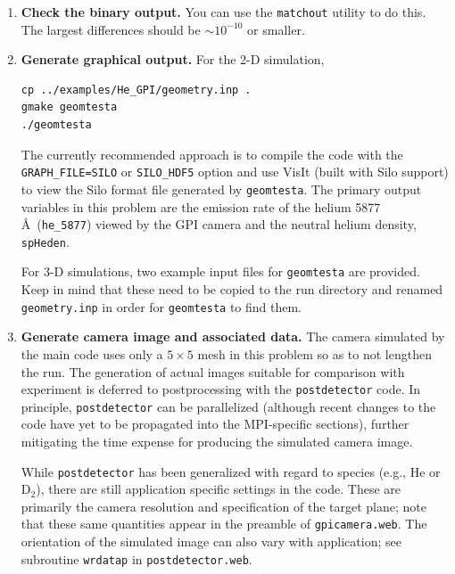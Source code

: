 \documentclass[12pt]{report}
\begin{document}
\begin{enumerate}
digits of precision.  If an exact match is not obtained, something
is amiss. These results were obtained with {\tt Triangle} V.\ 1.6.
  \item {\bf Check the binary output.}
You can use the {\tt matchout} utility to do this.  The largest differences
should be $\sim 10^{-10}$ or smaller.
  \item {\bf Generate graphical output.}
For the 2-D simulation,
\begin{verbatim}
cp ../examples/He_GPI/geometry.inp .
gmake geomtesta
./geomtesta
\end{verbatim}
The currently recommended approach is to compile the code with the
\verb+GRAPH_FILE=SILO+ or \verb+SILO_HDF5+ 
option and use VisIt (built with Silo
support) to view the Silo format file generated by {\tt geomtesta}.
The primary output variables in this problem are the emission rate
of the helium 5877 \AA\  (\verb+he_5877+) viewed by the GPI camera
and the neutral helium density, \verb+spHeden+.

For 3-D simulations, two example input files for {\tt geomtesta} are
provided.  Keep in mind that these need to be copied to the
run directory and renamed {\tt geometry.inp} in order for {\tt geomtesta} to
find them.
\item {\bf Generate camera image and associated data.}
The camera simulated by the main code uses only a $5 \times 5$ mesh in
this problem so as to not lengthen the run.  The
generation of actual images suitable for comparison with
experiment is deferred to postprocessing with the {\tt postdetector}
code.  In principle, {\tt postdetector} can be parallelized (although recent
changes to the code have yet to be propagated into the MPI-specific
sections), further mitigating the time expense for producing
the simulated camera image.

While {\tt postdetector} has been generalized with regard to species
(e.g., He or D$_{2}$), there are still application specific settings
in the code.  These are primarily the camera resolution and
specification of the target plane; note that these same
quantities appear in the preamble of {\tt gpicamera.web}.
The orientation of the simulated image can also vary with
application; see subroutine \verb+wrdatap+ in {\tt postdetector.web}.


\end{enumerate}
\end{document}
